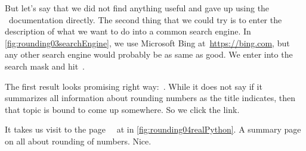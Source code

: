 \begin{noglslink}
But let's say that we did not find anything useful and gave up using the \python\ documentation directly.
The second thing that we could try is to enter the description of what we want to do into a common search engine.
In \cref{fig:rounding03searchEngine}, we use Microsoft Bing at~\url{https://bing.com}, but any other search engine would probably be as same as good.
We enter  into the search mask and hit~.

The first result looks promising right way:~.
While it does not say  if it summarizes all information about rounding numbers as the title indicates, then that topic is bound to come up somewhere.
So we click the link.

It takes us visit to the page~~\cite{D2021RPT:A2024HTRNIP} at  in \cref{fig:rounding04realPython}.
A summary page on all about rounding of numbers.
Nice.


\end{noglslink}
